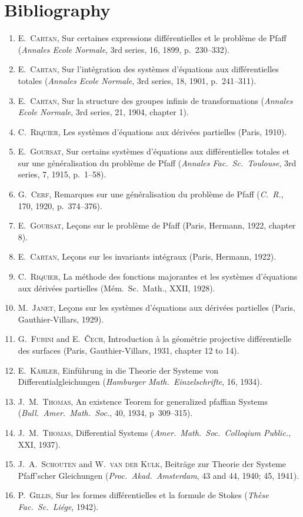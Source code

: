 \documentclass[leqno,11pt]{book}
\numberwithin{equation}{chapter}
\theoremstyle{shape1}
\theoremstyle{shape0}
\theoremstyle{shape2}
\theoremstyle{definition}
\begin{document}
{
\chapter*{Bibliography}
\small
\begin{enumerate}
\item \textsc{E.~Cartan}, Sur certaines expressions diff\'erentielles et le probl\`eme de Pfaff (\emph{Annales Ecole Normale}, 3rd series, 16, 1899, p.~230--332).
\item \textsc{E.~Cartan}, Sur l'int\'egration des syst\`emes d'\'equations aux diff\'erentielles totales (\emph{Annales Ecole Normale}, 3rd series, 18, 1901, p.~241--311).
\item \textsc{E.~Cartan}, Sur la structure des groupes infinis de transformations (\emph{Annales Ecole Normale}, 3rd series, 21, 1904, chapter 1).
\item \textsc{C.~Riquier}, Les syst\`emes d'\'equations aux d\'eriv\'ees partielles (Paris, 1910).
\item \textsc{E.~Goursat}, Sur certains syst\`emes d'\'equations aux diff\'erentielles totales et sur une g\'en\'eralisation du probl\`eme de Pfaff (\emph{Annales Fac.~Sc.~Toulouse}, 3rd series, 7, 1915, p.~1--58).
\item \textsc{G.~Cerf}, Remarques sur une g\'en\'eralisation du probl\`eme de Pfaff (\emph{C.~R.}, 170, 1920, p.~374--376).
\item \textsc{E.~Goursat}, Le\c{c}ons sur le probl\`eme de Pfaff (Paris, Hermann, 1922, chapter 8).
\item \textsc{E.~Cartan}, Le\c{c}ons sur les invariants int\'egraux (Paris, Hermann, 1922).
\item \textsc{C.~Riquier}, La m\'ethode des fonctions majorantes et les syst\`emes d'\'equations aux d\'eriv\'ees partielles (M\'em.~Sc.~Math., XXII, 1928).
\item \textsc{M.~Janet}, Le\c{c}ons sur les syst\`emes d'\'equations aux d\'eriv\'ees partielles (Paris, Gauthier-Villars, 1929).
\item \textsc{G.~Fubini} and \textsc{E.~\v{C}ech}, Introduction \`a la g\'eom\'etrie projective diff\'erentielle des surfaces (Paris, Gauthier-Villars, 1931, chapter 12 to 14).
\item \textsc{E.~K\"ahler}, Einf\"uhrung in die Theorie der Systeme von Differentialgleichungen (\emph{Hamburger Math.~Einzelschrifte}, 16, 1934).
\item \textsc{J.~M.~Thomas}, An existence Teorem for generalized pfaffian Systems (\emph{Bull.\ Amer.\ Math.\ Soc.}, 40, 1934, p~309--315).
\item \textsc{J.~M.~Thomas}, Differential Systems (\emph{Amer.~Math.~Soc.~Colloqium Public.}, XXI, 1937).
\item \textsc{J.~A.~Schouten} and \textsc{W.~van der Kulk}, Beitr\"age zur Theorie der Systeme Pfaff'scher Gleichungen (\emph{Proc.~Akad.~Amsterdam}, 43 and 44, 1940; 45, 1941).
\item \textsc{P.~Gillis}, Sur les formes diff\'erentielles et la formule de Stokes (\emph{Th\`ese Fac.~Sc.~Li\'ege}, 1942).
\end{enumerate}

}
\end{document}
